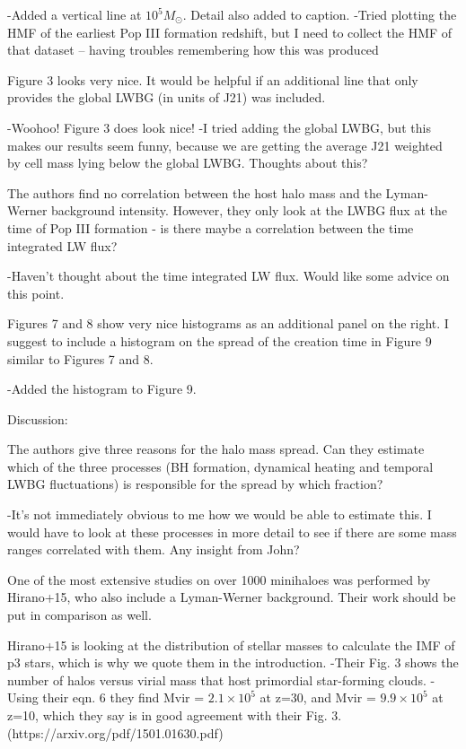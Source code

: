 \documentclass[11pt]{article}
\newenvironment{referee}[1][]{%
    \ignorespaces%
    \begin{mdframed}[style=myquotestyle,#1]%
}{%
    \end{mdframed}%
    \ignorespacesafterend%
}%
\begin{document}
-Added a vertical line at $10^5 M_{\odot}$. Detail also added to caption.
-Tried plotting the HMF of the earliest Pop III formation redshift, but I need to collect the HMF of that dataset -- having troubles remembering how this was produced 


\begin{referee}
Figure 3 looks very nice. It would be helpful if an additional line that only 
provides the global LWBG (in units of J21) was included.
\end{referee}
-Woohoo! Figure 3 does look nice!
-I tried adding the global LWBG, but this makes our results seem funny, because we are getting the average J21 weighted by cell mass lying below the global LWBG. Thoughts about this?

\begin{referee}
The authors find no correlation between the host halo mass and the Lyman-Werner background intensity. However, they only look at the LWBG flux at the time of Pop III formation - is there maybe a correlation between the time integrated LW flux?
\end{referee}
-Haven't thought about the time integrated LW flux. Would like some advice on this point. 

\begin{referee}
Figures 7 and 8 show very nice histograms as an additional panel on the right.  I suggest to include a histogram on the spread of the creation time in Figure 9 similar to Figures 7 and 8.
\end{referee}
-Added the histogram to Figure 9. 

\begin{referee}
Discussion:

The authors give three reasons for the halo mass spread. Can they estimate which of the three processes (BH formation, dynamical heating and temporal LWBG fluctuations) is responsible for the spread by which fraction?
\end{referee}
-It's not immediately obvious to me how we would be able to estimate this. I would have to look at these processes in more detail to see if there are some mass ranges correlated with them. Any insight from John?

\begin{referee}
One of the most extensive studies on over 1000 minihaloes was performed by Hirano+15, who also include a Lyman-Werner background. Their work should be put in comparison as well.
\end{referee}
Hirano+15 is looking at the distribution of stellar masses to calculate the IMF of p3 stars, which is why we quote them in the introduction. 
-Their Fig. 3 shows the number of halos versus virial mass that host primordial star-forming clouds. 
-Using their eqn. 6 they find Mvir = $2.1 \times 10^5$ at z=30, and Mvir = $9.9 \times 10^5$ at z=10, which they say is in good agreement with their Fig. 3. 
(https://arxiv.org/pdf/1501.01630.pdf)
\end{document}
